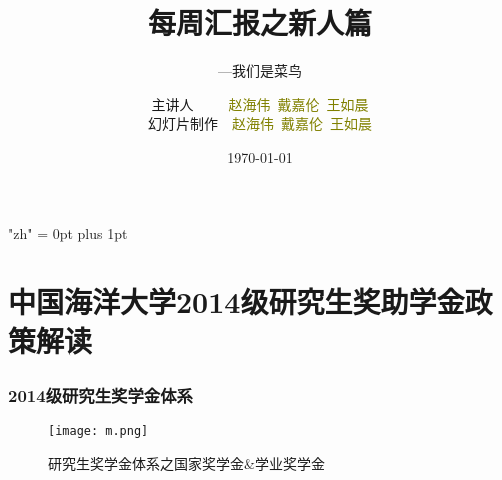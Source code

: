 \documentclass[notheorems,mathserif,table,compress]{beamer}  %
\begin{document}
\XeTeXlinebreaklocale "zh"         %
\XeTeXlinebreakskip = 0pt plus 1pt %
\begin{comment}
\AtBeginSection[]{                              %
  \frame<handout:0>{
    \frametitle{Content}\small
    \tableofcontents[current,currentsubsection]
  }
}
\AtBeginSubsection[]                            %
{
  \frame<handout:0>                             %
  {
    \frametitle{下一节内容}\small
    \tableofcontents[current,currentsubsection] %
  }
}
\end{comment}
\title[每周汇报之新人篇]{每周汇报之新人篇}
\subtitle{---我们是菜鸟}
\author[CVBIOUC]{主讲人~~~~~\textcolor{olive}{赵海伟\ 戴嘉伦\ 王如晨}\\
    \quad 幻灯片制作~~\textcolor{olive}{赵海伟\ 戴嘉伦\ 王如晨}}
\date{\today}
\frame{ \titlepage }

\section{中国海洋大学2014级研究生奖助学金政策解读}

\begin{frame}
  \frametitle{2014级研究生奖学金体系}
  \begin{figure}[!ht]
  \centering\texttt{[image: m.png]}
  \caption{研究生奖学金体系之国家奖学金\&学业奖学金}
  \end{figure} 
\end{frame}
\end{document}
